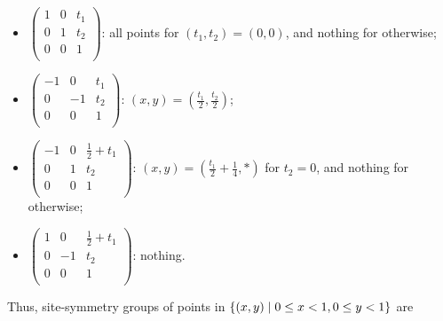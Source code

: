 \begin{itemize}
  \item $\left(
    \begin{array}{cc|c}
        1 & 0 & t_{1} \\
        0 & 1 & t_{2} \\
        \hline
        0 & 0 & 1 \\
    \end{array}
  \right)$: all points for $(t_{1}, t_{2}) = (0, 0)$, and nothing for otherwise;
  \item $\left(
    \begin{array}{cc|c}
        -1 & 0 & t_{1} \\
        0  & -1 & t_{2} \\
        \hline
        0 & 0 & 1 \\
    \end{array}
  \right)$: $(x, y) = \left( \frac{t_{1}}{2}, \frac{t_{2}}{2} \right)$;
  \item $\left(
    \begin{array}{cc|c}
        -1 & 0 & \frac{1}{2} + t_{1} \\
        0  & 1 & t_{2} \\
        \hline
        0 & 0 & 1 \\
    \end{array}
  \right)$: $(x, y) = \left( \frac{t_{1}}{2} + \frac{1}{4}, \ast \right)$ for $t_{2} = 0$, and nothing for otherwise;
  \item $\left(
    \begin{array}{cc|c}
        1 & 0 & \frac{1}{2} + t_{1} \\
        0  & -1 & t_{2} \\
        \hline
        0 & 0 & 1 \\
    \end{array}
  \right)$: nothing.
\end{itemize}
Thus, site-symmetry groups of points in $\left\{ (x, y) \mathrel{}\middle|\mathrel{}  0 \leq x < 1, 0 \leq y < 1 \right\}$ are
